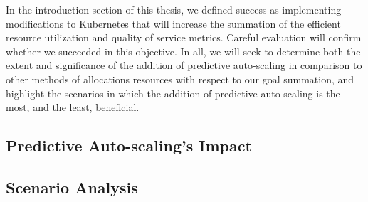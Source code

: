 In the introduction section of this thesis, we defined success as implementing
modifications to Kubernetes that will increase the summation of the
efficient resource utilization and quality of service metrics. Careful
evaluation will confirm whether we succeeded in this objective. In all, we will
seek to determine both the extent and significance of the addition of predictive
auto-scaling in comparison to other methods of allocations resources with
respect to our goal summation, and highlight the scenarios in which the addition
of predictive auto-scaling is the most, and the least, beneficial.

\subsection{Predictive Auto-scaling's Impact}



\subsection{Scenario Analysis}


